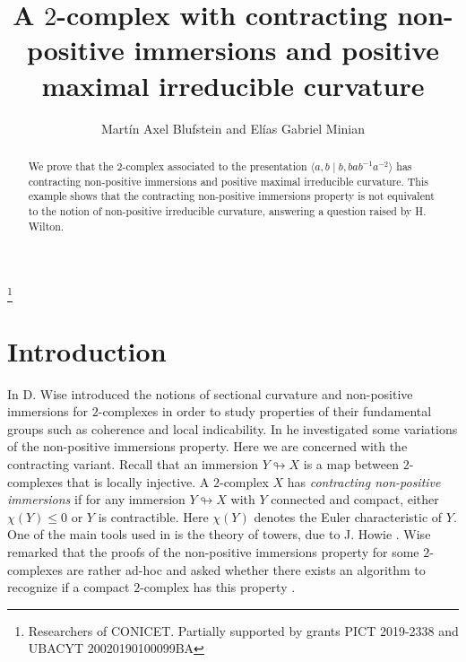 \documentclass{amsart}
\theoremstyle{plain}
\theoremstyle{definition}
\theoremstyle{remark}
\numberwithin{equation}{section}
\begin{document}
\title[A $2$-complex with contracting non-positive immersions]{A $2$-complex with contracting non-positive immersions and positive maximal irreducible curvature}

\author{Mart\'in Axel Blufstein and El\'ias Gabriel Minian}

\address{Departamento  de Matem\'atica - IMAS\\
 FCEyN, Universidad de Buenos Aires. Buenos Aires, Argentina.}

\thanks{Researchers of CONICET. Partially supported by grants PICT 2019-2338 and UBACYT 20020190100099BA}






\begin{abstract}
We prove that the $2$-complex associated to the presentation $\langle a,b \mid b,bab^{-1}a^{-2}\rangle$ has contracting non-positive immersions and  positive maximal irreducible curvature. This example shows that the contracting non-positive immersions property is not equivalent to the notion of non-positive irreducible curvature, answering a question raised by H. Wilton.
\end{abstract}

\maketitle


\section{Introduction}


In \cite{Wis03,Wis04} D. Wise introduced the notions of sectional curvature and non-positive immersions for $2$-complexes in order to study properties of their fundamental groups such as coherence and local indicability. In \cite{Wis22} he investigated some variations of the non-positive immersions property.  Here we are concerned with the contracting variant. Recall that an immersion $Y\looparrowright X$ is a map between $2$-complexes that is locally injective. A $2$-complex $X$ has \emph{contracting non-positive immersions} if for any immersion  $Y\looparrowright X$ with $Y$ connected and compact, either $\chi(Y)\leq0$ or $Y$ is contractible. Here  $\chi(Y)$ denotes the Euler characteristic of $Y$. One of the main tools used in \cite{Wis03,Wis04,Wis22} is the theory of towers, due to J. Howie \cite{How81}. Wise remarked that the proofs of the non-positive immersions property for some $2$-complexes are rather ad-hoc and asked whether there exists an algorithm to recognize if a compact $2$-complex has this property \cite[Problem 1.9]{Wis22}.
\end{document}
